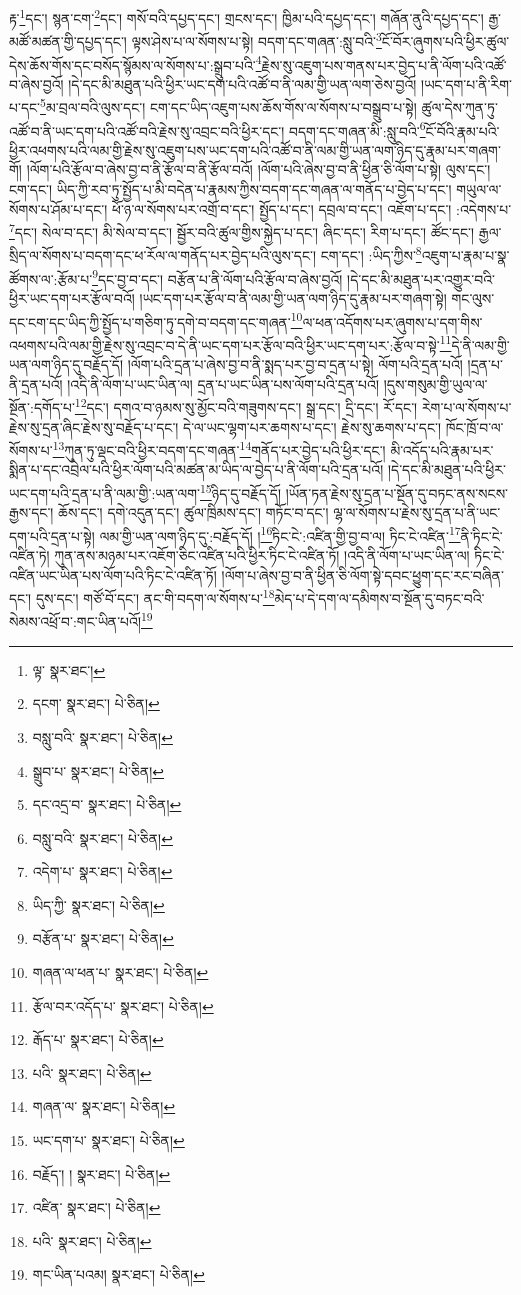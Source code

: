 རྟ་\footnote{ལྟ་  སྣར་ཐང་། }དང་། སྙན་ངག་\footnote{དངག་  སྣར་ཐང་།  པེ་ཅིན། }དང་། གསོ་བའི་དཔྱད་དང་། གྲངས་དང་། ཁྱིམ་པའི་དཔྱད་དང་། གཞོན་ནུའི་དཔྱད་དང་། རྒྱ་མཚོ་མཚན་གྱི་དཔྱད་དང་། ལྟས་ཤེས་པ་ལ་སོགས་པ་སྟེ། བདག་དང་གཞན་:སླུ་བའི་\footnote{བསླུ་བའི་  སྣར་ཐང་།  པེ་ཅིན། }ངོ་བོར་ཞུགས་པའི་ཕྱིར་ཚུལ་དེས་ཆོས་གོས་དང་བསོད་སྙོམས་ལ་སོགས་པ་:སྒྲུབ་པའི་\footnote{སྒྲུབ་པ་  སྣར་ཐང་།  པེ་ཅིན། }རྗེས་སུ་འཇུག་པས་གནས་པར་བྱེད་པ་ནི་ལོག་པའི་འཚོ་བ་ཞེས་བྱའོ། །དེ་དང་མི་མཐུན་པའི་ཕྱིར་ཡང་དག་པའི་འཚོ་བ་ནི་ལམ་གྱི་ཡན་ལག་ཅེས་བྱའོ། །ཡང་དག་པ་ནི་རིག་པ་དང་\footnote{དང་འདྲ་བ་  སྣར་ཐང་།  པེ་ཅིན། }མ་བྲལ་བའི་ལུས་དང་། ངག་དང་ཡིད་འཇུག་པས་ཆོས་གོས་ལ་སོགས་པ་བསྒྲུབ་པ་སྟེ། ཚུལ་དེས་ཀུན་ཏུ་འཚོ་བ་ནི་ཡང་དག་པའི་འཚོ་བའི་རྗེས་སུ་འབྲང་བའི་ཕྱིར་དང་། བདག་དང་གཞན་མི་:སླུ་བའི་\footnote{བསླུ་བའི་  སྣར་ཐང་།  པེ་ཅིན། }ངོ་བོའི་རྣམ་པའི་ཕྱིར་འཕགས་པའི་ལམ་གྱི་རྗེས་སུ་འཇུག་པས་ཡང་དག་པའི་འཚོ་བ་ནི་ལམ་གྱི་ཡན་ལག་ཉིད་དུ་རྣམ་པར་གཞག་གོ། །ལོག་པའི་རྩོལ་བ་ཞེས་བྱ་བ་ནི་རྩོལ་བ་ནི་རྩོལ་བའོ། །ལོག་པའི་ཞེས་བྱ་བ་ནི་ཕྱིན་ཅི་ལོག་པ་སྟེ། ལུས་དང་། ངག་དང་། ཡིད་ཀྱི་རབ་ཏུ་སྤྱོད་པ་མི་བདེན་པ་རྣམས་ཀྱིས་བདག་དང་གཞན་ལ་གནོད་པ་བྱེད་པ་དང་། གཡུལ་ལ་སོགས་པ་ཤོམ་པ་དང་། ཕོ་ཉ་ལ་སོགས་པར་འགྲོ་བ་དང་། སྤྱོད་པ་དང་། དབྲལ་བ་དང་། འཇོག་པ་དང་། :འདེགས་པ་\footnote{འདེག་པ་  སྣར་ཐང་།  པེ་ཅིན། }དང་། སེལ་བ་དང་། མི་སེལ་བ་དང་། སྦྱོར་བའི་ཚུལ་གྱིས་སྐྱེད་པ་དང་། ཞིང་དང་། རིག་པ་དང་། ཚོང་དང་། རྒྱལ་སྲིད་ལ་སོགས་པ་བདག་དང་ཕ་རོལ་ལ་གནོད་པར་བྱེད་པའི་ལུས་དང་། ངག་དང་། :ཡིད་ཀྱིས་\footnote{ཡིད་ཀྱི་  སྣར་ཐང་།  པེ་ཅིན། }འཇུག་པ་རྣམ་པ་སྣ་ཚོགས་ལ་:རྩོམ་པ་\footnote{བརྩོན་པ་  སྣར་ཐང་།  པེ་ཅིན། }དང་བྱ་བ་དང་། བརྩོན་པ་ནི་ལོག་པའི་རྩོལ་བ་ཞེས་བྱའོ། །དེ་དང་མི་མཐུན་པར་འགྱུར་བའི་ཕྱིར་ཡང་དག་པར་རྩོལ་བའོ། །ཡང་དག་པར་རྩོལ་བ་ནི་ལམ་གྱི་ཡན་ལག་ཉིད་དུ་རྣམ་པར་གཞག་སྟེ། གང་ལུས་དང་ངག་དང་ཡིད་ཀྱི་སྤྱོད་པ་གཅིག་ཏུ་དགེ་བ་བདག་དང་གཞན་\footnote{གཞན་ལ་ཕན་པ་  སྣར་ཐང་།  པེ་ཅིན། }ལ་ཕན་འདོགས་པར་ཞུགས་པ་དག་གིས་འཕགས་པའི་ལམ་གྱི་རྗེས་སུ་འབྲང་བ་དེ་ནི་ཡང་དག་པར་རྩོལ་བའི་ཕྱིར་ཡང་དག་པར་:རྩོལ་བ་སྟེ་\footnote{རྩོལ་བར་འདོད་པ་  སྣར་ཐང་།  པེ་ཅིན། }དེ་ནི་ལམ་གྱི་ཡན་ལག་ཉིད་དུ་བརྗོད་དོ། །ལོག་པའི་དྲན་པ་ཞེས་བྱ་བ་ནི་སྨད་པར་བྱ་བ་དྲན་པ་སྟེ། ལོག་པའི་དྲན་པའོ། །དྲན་པ་ནི་དྲན་པའོ། །འདི་ནི་ལོག་པ་ཡང་ཡིན་ལ། དྲན་པ་ཡང་ཡིན་པས་ལོག་པའི་དྲན་པའོ། །དུས་གསུམ་གྱི་ཡུལ་ལ་སྔོན་:དགོད་པ་\footnote{རྒོད་པ་  སྣར་ཐང་།  པེ་ཅིན། }དང་། དགའ་བ་ཉམས་སུ་མྱོང་བའི་གཟུགས་དང་། སྒྲ་དང་། དྲི་དང་། རོ་དང་། རེག་པ་ལ་སོགས་པ་རྗེས་སུ་དྲན་ཞིང་རྗེས་སུ་བརྗོད་པ་དང་། དེ་ལ་ཡང་ལྷག་པར་ཆགས་པ་དང་། རྗེས་སུ་ཆགས་པ་དང་། ཁོང་ཁྲོ་བ་ལ་སོགས་པ་\footnote{པའི་  སྣར་ཐང་།  པེ་ཅིན། }ཀུན་ཏུ་ལྡང་བའི་ཕྱིར་བདག་དང་གཞན་\footnote{གཞན་ལ་  སྣར་ཐང་།  པེ་ཅིན། }གནོད་པར་བྱེད་པའི་ཕྱིར་དང་། མི་འདོད་པའི་རྣམ་པར་སྨིན་པ་དང་འབྲེལ་པའི་ཕྱིར་ལོག་པའི་མཚན་མ་ཡིད་ལ་བྱེད་པ་ནི་ལོག་པའི་དྲན་པའོ། །དེ་དང་མི་མཐུན་པའི་ཕྱིར་ཡང་དག་པའི་དྲན་པ་ནི་ལམ་གྱི་:ཡན་ལག་\footnote{ཡང་དག་པ་  སྣར་ཐང་།  པེ་ཅིན། }ཉིད་དུ་བརྗོད་དོ། །ཡོན་ཏན་རྗེས་སུ་དྲན་པ་སྔོན་དུ་བཏང་ནས་སངས་རྒྱས་དང་། ཆོས་དང་། དགེ་འདུན་དང་། ཚུལ་ཁྲིམས་དང་། གཏོང་བ་དང་། ལྷ་ལ་སོགས་པ་རྗེས་སུ་དྲན་པ་ནི་ཡང་དག་པའི་དྲན་པ་སྟེ། ལམ་གྱི་ཡན་ལག་ཉིད་དུ་:བརྗོད་དོ། །\footnote{བརྗོད་། །   སྣར་ཐང་།  པེ་ཅིན། }ཏིང་ངེ་:འཛིན་གྱི་བྱ་བ་ལ། ཏིང་ངེ་འཛིན་\footnote{འཛིན་  སྣར་ཐང་།  པེ་ཅིན། }ནི་ཏིང་ངེ་འཛིན་ཏེ། ཀུན་ནས་མཉམ་པར་འཇོག་ཅིང་འཛིན་པའི་ཕྱིར་ཏིང་ངེ་འཛིན་ཏོ། །འདི་ནི་ལོག་པ་ཡང་ཡིན་ལ། ཏིང་ངེ་འཛིན་ཡང་ཡིན་པས་ལོག་པའི་ཏིང་ངེ་འཛིན་ཏོ། །ལོག་པ་ཞེས་བྱ་བ་ནི་ཕྱིན་ཅི་ལོག་སྟེ་དབང་ཕྱུག་དང་རང་བཞིན་དང་། དུས་དང་། གཙོ་བོ་དང་། ནང་གི་བདག་ལ་སོགས་པ་\footnote{པའི་  སྣར་ཐང་།  པེ་ཅིན། }མེད་པ་དེ་དག་ལ་དམིགས་བ་སྔོན་དུ་བཏང་བའི་སེམས་འཕྲོ་བ་:གང་ཡིན་པའོ།\footnote{གང་ཡིན་པའམ།  སྣར་ཐང་།  པེ་ཅིན། } 